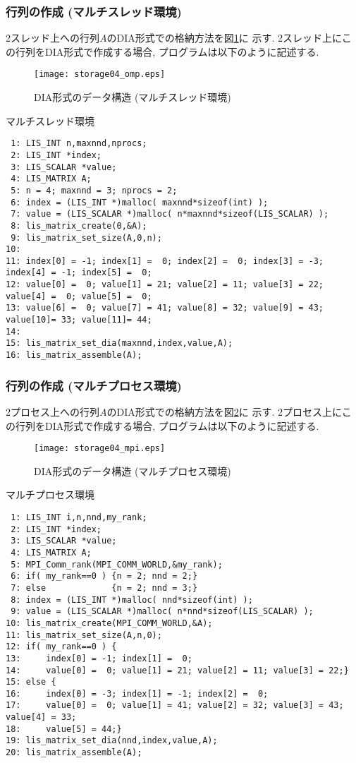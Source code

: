 \documentclass[a4paper]{jarticle}
\begin{document}
{{\subsubsection{行列の作成 (マルチスレッド環境)}
2スレッド上への行列$A$のDIA形式での格納方法を図\ref{fig:storage04_omp}に
示す. 
2スレッド上にこの行列をDIA形式で作成する場合, プログラムは以下のように記述する. 
\begin{figure}[h]
{\centering 
\texttt{[image: storage04\_omp.eps]} 
\caption{DIA形式のデータ構造 (マルチスレッド環境)}\label{fig:storage04_omp}}
\end{figure}
\begin{itembox}[l]{マルチスレッド環境}
\small
\begin{verbatim}
 1: LIS_INT n,maxnnd,nprocs;
 2: LIS_INT *index;
 3: LIS_SCALAR *value;
 4: LIS_MATRIX A;
 5: n = 4; maxnnd = 3; nprocs = 2;
 6: index = (LIS_INT *)malloc( maxnnd*sizeof(int) );
 7: value = (LIS_SCALAR *)malloc( n*maxnnd*sizeof(LIS_SCALAR) );
 8: lis_matrix_create(0,&A);
 9: lis_matrix_set_size(A,0,n);
10:
11: index[0] = -1; index[1] =  0; index[2] =  0; index[3] = -3; index[4] = -1; index[5] =  0;
12: value[0] =  0; value[1] = 21; value[2] = 11; value[3] = 22; value[4] =  0; value[5] =  0;
13: value[6] =  0; value[7] = 41; value[8] = 32; value[9] = 43; value[10]= 33; value[11]= 44;
14:
15: lis_matrix_set_dia(maxnnd,index,value,A);
16: lis_matrix_assemble(A);
\end{verbatim}
\end{itembox}
\newpage

\subsubsection{行列の作成 (マルチプロセス環境)}
2プロセス上への行列$A$のDIA形式での格納方法を図\ref{fig:storage04_mpi}に
示す. 
2プロセス上にこの行列をDIA形式で作成する場合, プログラムは以下のように記述する. 
\begin{figure}[h]
{\centering 
\texttt{[image: storage04\_mpi.eps]} 
\caption{DIA形式のデータ構造 (マルチプロセス環境)}\label{fig:storage04_mpi}}
\end{figure}
\begin{itembox}[l]{マルチプロセス環境}
\small
\begin{verbatim}
 1: LIS_INT i,n,nnd,my_rank;
 2: LIS_INT *index;
 3: LIS_SCALAR *value;
 4: LIS_MATRIX A;
 5: MPI_Comm_rank(MPI_COMM_WORLD,&my_rank);
 6: if( my_rank==0 ) {n = 2; nnd = 2;}
 7: else             {n = 2; nnd = 3;}
 8: index = (LIS_INT *)malloc( nnd*sizeof(int) );
 9: value = (LIS_SCALAR *)malloc( n*nnd*sizeof(LIS_SCALAR) );
10: lis_matrix_create(MPI_COMM_WORLD,&A);
11: lis_matrix_set_size(A,n,0);
12: if( my_rank==0 ) {
13:     index[0] = -1; index[1] =  0;
14:     value[0] =  0; value[1] = 21; value[2] = 11; value[3] = 22;}
15: else {
16:     index[0] = -3; index[1] = -1; index[2] =  0;
17:     value[0] =  0; value[1] = 41; value[2] = 32; value[3] = 43; value[4] = 33;
18:     value[5] = 44;}
19: lis_matrix_set_dia(nnd,index,value,A);
20: lis_matrix_assemble(A);
\end{verbatim}
\end{itembox}

}}
\end{document}
